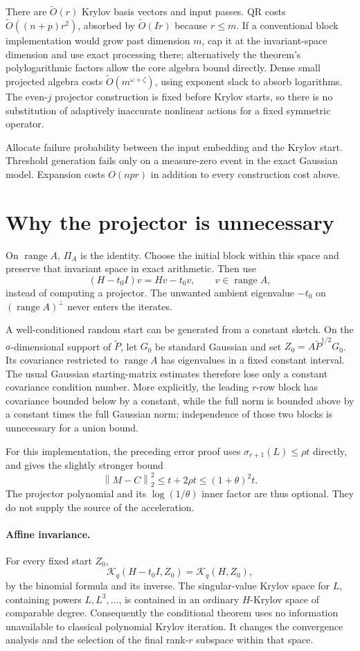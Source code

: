 \documentclass[11pt]{article}
\newcommand{\norm}[1]{\left\lVert #1\right\rVert}
\newcommand{\range}{\operatorname{range}}
\newcommand{\tO}{\widetilde O}
\begin{document}
There are \(\tO(r)\) Krylov basis vectors and input passes. QR costs
\(\tO((n+p)r^2)\), absorbed by \(\tO(Ir)\) because \(r\le m\).
If a conventional block implementation would grow past dimension \(m\),
cap it at the invariant-space dimension and use exact processing there;
alternatively the theorem's polylogarithmic factors allow the core algebra
bound directly. Dense small projected algebra costs
\(\tO(m^{\omega+\zeta})\), using exponent slack to absorb logarithms.
The even-\(j\) projector construction is fixed before Krylov starts,
so there is no substitution of adaptively inaccurate nonlinear actions for
a fixed symmetric operator.

Allocate failure probability between the input embedding and the Krylov
start. Threshold generation fails only on a measure-zero event in the
exact Gaussian model. Expansion costs \(O(npr)\) in addition to every
construction cost above.

\section{Why the projector is unnecessary}
On \(\range A\), \(\Pi_A\) is the identity. Choose the initial
block within this space and preserve that invariant space in exact
arithmetic. Then use
\[
 (H-t_0I)v=H v-t_0v,\qquad v\in\range A,
\]
instead of computing a projector. The unwanted ambient eigenvalue
\(-t_0\) on \((\range A)^\perp\) never enters the iterates.

A well-conditioned random start can be generated from a constant sketch.
On the \(a\)-dimensional support of \(\widetilde P\), let
\(G_0\) be standard Gaussian and set
\(Z_0=A\widetilde P^{\dagger/2}G_0\). Its covariance restricted
to \(\range A\) has eigenvalues in a fixed constant interval.
The usual Gaussian starting-matrix estimates therefore lose only a
constant covariance condition number. More explicitly, the leading
\(r\)-row block has covariance bounded below by a constant, while
the full norm is bounded above by a constant times the full Gaussian norm;
independence of those two blocks is unnecessary for a union bound.

For this implementation, the preceding error proof uses
\(\sigma_{r+1}(L)\le\rho t\) directly, and gives the slightly
stronger bound
\[
 \norm{M-C}_2^2\le t+2\rho t\le(1+\theta)^2t.
\]
The projector polynomial and its \(\log(1/\theta)\) inner factor
are thus optional. They do not supply the source of the acceleration.

\paragraph{Affine invariance.}
For every fixed start \(Z_0\),
\[
 \mathcal K_q(H-t_0I,Z_0)=\mathcal K_q(H,Z_0),
\]
by the binomial formula and its inverse. The singular-value Krylov space
for \(L\), containing powers \(L,L^3,\ldots\), is contained in an
ordinary \(H\)-Krylov space of comparable degree. Consequently the
conditional theorem uses no information unavailable to classical
polynomial Krylov iteration. It changes the convergence analysis and the
selection of the final rank-\(r\) subspace within that space.
\end{document}
